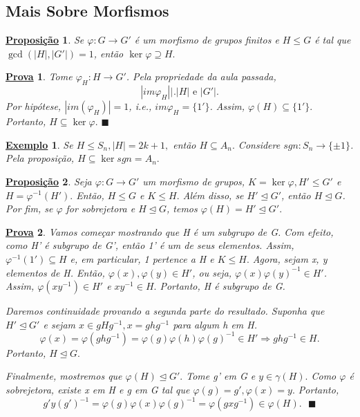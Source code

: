 \documentclass{article}
\newtheorem*{prop*}{\underline{Proposi\c c\~ao}}
\newtheorem{example*}{\underline{Exemplo}}
\newtheorem*{proof*}{\underline{Prova}}
\renewcommand\qedsymbol{$\blacksquare$}
\begin{document}
\subsection{Mais Sobre Morfismos}
\begin{prop*}
  Se $\varphi:G\rightarrow G'$ \'e um morfismo de grupos finitos e $H\leq{G}$ \'e tal que  $\gcd{(|H|, |G'|)} = 1$, ent\~ao $\ker{\varphi}\supseteq{H}.$
\end{prop*}
\begin{proof*}
  Tome $\varphi_{H}:H\rightarrow G'$. Pela propriedade da aula passada, 
    $$
    |im{\varphi_{H}}|\biggl|_{}^{}\biggr. |H|\text{ e } |G'|.
    $$
    Por hip\'otese, $|im(\varphi_{H})|=1$, i.e., $im \varphi_{H} = \{1'\}$. Assim, $\varphi(H)\subseteq{\{1'\}}.$
    Portanto, $H\subseteq{\ker{\varphi}}.$ \qedsymbol
\end{proof*}
\begin{example*}
  Se $H\leq{S_{n}}, |H| = 2k+1,$ ent\~ao $H\subseteq{A_{n}}.$ Considere $sgn:S_{n}\rightarrow \{\pm1\}$. Pela proposi\c c\~ao,
  $H\subseteq{\ker{sgn}}=A_{n}.$
\end{example*}
\begin{prop*}
  Seja $\varphi:G\rightarrow G'$ um morfismo de grupos, $K=\ker{\varphi}, H'\leq{G'}$ e $H = \varphi^{-1}(H').$ Ent\~ao, 
 $H\leq{G}$ e $K\leq{H}.$ Al\'em disso, se $H'\trianglelefteq{G'}$, ent\~ao $H\trianglelefteq{G}$. Por fim, se $\varphi$ for
 sobrejetora e $H\trianglelefteq{G}$, temos $\varphi(H) = H'\trianglelefteq{G'}.$
\end{prop*}
\begin{proof*}
  Vamos come\c car mostrando que H \'e um subgrupo de G. Com efeito, como H' \'e subgrupo de G', ent\~ao 1' \'e um de seus elementos.
Assim, $\varphi^{-1}(1')\subseteq{H}$ e, em particular, 1 pertence a H e $K\leq{H}.$ Agora, sejam x, y elementos de H. Ent\~ao,
 $\varphi(x), \varphi(y)\in H'$, ou seja, $\varphi(x)\varphi(y)^{-1}\in H'$. Assim, $\varphi(xy^{-1})\in H'$ e $xy^{-1}\in H.$
Portanto, H \'e subgrupo de G.

  Daremos continuidade provando a segunda parte do resultado. Suponha que $H'\trianglelefteq{G'}$ e sejam $x\in gHg^{-1}, x = ghg^{-1}$ 
para algum h em H. 
  $$
    \varphi(x) = \varphi(ghg^{-1}) = \varphi(g)\varphi(h)\varphi(g)^{-1}\in H' \Rightarrow ghg^{-1}\in H.
  $$
Portanto, $H\trianglelefteq{G}.$

  Finalmente, mostremos que $\varphi(H)\trianglelefteq{G'}.$ Tome g' em G e $y\in\gamma(H).$ Como $\varphi$ \'e sobrejetora, existe
x em H e g em G tal que $\varphi(g)=g', \varphi(x) = y.$ Portanto,
  $$
  g'y(g')^{-1} = \varphi(g)\varphi(x)\varphi(g)^{-1} = \varphi(gxg^{-1})\in \varphi(H).\text{ \qedsymbol}
  $$
\end{proof*}
\end{document}

